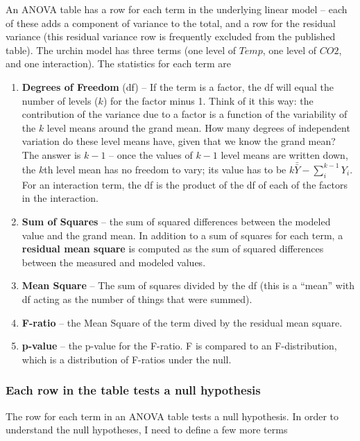 \documentclass[]{book}
\providecommand{\tightlist}{%
  \setlength{\itemsep}{0pt}\setlength{\parskip}{0pt}}
\begin{document}
An ANOVA table has a row for each term in the underlying linear model --
each of these adds a component of variance to the total, and a row for
the residual variance (this residual variance row is frequently excluded
from the published table). The urchin model has three terms (one level
of \(Temp\), one level of \(CO2\), and one interaction). The statistics
for each term are

\begin{enumerate}
\def\labelenumi{\arabic{enumi}.}
\tightlist
\item
  \textbf{Degrees of Freedom} (df) -- If the term is a factor, the df
  will equal the number of levels (\(k\)) for the factor minus 1. Think
  of it this way: the contribution of the variance due to a factor is a
  function of the variability of the \(k\) level means around the grand
  mean. How many degrees of independent variation do these level means
  have, given that we know the grand mean? The answer is \(k-1\) -- once
  the values of \(k-1\) level means are written down, the \(k\)th level
  mean has no freedom to vary; its value has to be
  \(k\bar{\bar{Y}} - \sum_i^{k-1}{Y_i}\). For an interaction term, the
  df is the product of the df of each of the factors in the interaction.
\item
  \textbf{Sum of Squares} -- the sum of squared differences between the
  modeled value and the grand mean. In addition to a sum of squares for
  each term, a \textbf{residual mean square} is computed as the sum of
  squared differences between the measured and modeled values.
\item
  \textbf{Mean Square} -- The sum of squares divided by the df (this is
  a ``mean'' with df acting as the number of things that were summed).
\item
  \textbf{F-ratio} -- the Mean Square of the term dived by the residual
  mean square.
\item
  \textbf{p-value} -- the p-value for the F-ratio. F is compared to an
  F-distribution, which is a distribution of F-ratios under the null.
\end{enumerate}

\subsubsection{Each row in the table tests a null
hypothesis}\label{each-row-in-the-table-tests-a-null-hypothesis}

The row for each term in an ANOVA table tests a null hypothesis. In
order to understand the null hypotheses, I need to define a few more
terms
\end{document}
